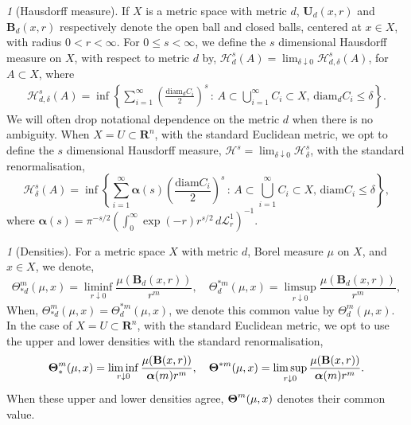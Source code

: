 \documentclass{article}
\theoremstyle{plain}
\theoremstyle{definition}
\theoremstyle{plain}
\theoremstyle{remark}
\newtheorem{propparagraph}[theorem]{}
\theoremstyle{remark}
\theoremstyle{plain}
\DeclareMathOperator*{\bfalpha}{\boldsymbol{\alpha}}
\DeclareMathOperator*{\Density}{\boldsymbol{\rm \Theta}}
\begin{document}
\begin{propparagraph}[Hausdorff measure]\label{para: hausdorff measure}
If $X$ is a metric space
with metric $d$, $\mathbf U_{d}(x,r)$ and $\mathbf B_{d}(x,r)$ respectively denote the open ball and closed balls, centered at $x\in X$, with radius $0<r<\infty$.
For $0 \leq s <  \infty$, we define the $s$ dimensional Hausdorff measure on $X$, with respect to metric $d$ by, $\mathscr{H}_{d}^{s} (A) = \lim_{\delta \downarrow 0} \mathscr{H}_{d, \delta}^{s} (A)$, for $A \subset X$, where
    \begin{eqnarray*}
         \mathscr{H}_{d, \delta}^{s} (A) = \inf \left\{ \sum_{i = 1}^{\infty} \left( \frac{\mathrm{diam}_{d} C_{i}}{2} \right)^{s} \, \colon \, A \subset \bigcup_{i = 1}^{\infty} C_{i} \subset X, \, \mathrm{diam}_{d} C_{i} \leq \delta \right\}.
    \end{eqnarray*}
We will often drop notational dependence on the metric $d$ when there is no ambiguity.
When $X = U \subset \mathbf{R}^{n}$, with the standard Euclidean metric, we opt to define the $s$ dimensional Hausdorff measure, $\mathscr{H}^{s} = \lim_{\delta \downarrow 0} \mathscr{H}^{s}_{\delta}$, with the standard renormalisation, 
\begin{equation*}
    \mathscr{H}_{\delta}^{s} (A) = \inf \left\{ \sum_{i = 1}^{\infty} \boldsymbol{\alpha} (s)\left( \frac{\mathrm{diam} C_{i}}{2} \right)^{s} \, \colon \, A \subset \bigcup_{i = 1}^{\infty} C_{i} \subset X, \, \mathrm{diam} C_{i} \leq \delta \right\},
\end{equation*}
where $\boldsymbol{\alpha} (s) = \pi^{- s / 2} \left( \int_{0}^{\infty} \exp (-r) r^{s / 2} \, d \mathscr{L}^{1}_{r} \right)^{-1}$.
\end{propparagraph}

\begin{propparagraph}[Densities]\label{para: densities}
    For a metric space $X$ with metric $d$, Borel measure $\mu$ on $X$, and $x \in X$, we denote,
    \begin{equation*}
        \Theta_{* d}^{m} (\mu ,x) = \liminf_{r \downarrow 0} \frac{\mu (\mathbf{B}_{d} (x, r))}{r^{m}}, \quad \Theta_{d}^{* m} (\mu ,x) = \limsup_{r \downarrow 0} \frac{\mu (\mathbf{B}_{d} (x, r))}{r^{m}},
    \end{equation*}
    When, $\Theta_{* d}^{m} (\mu ,x) = \Theta_{d}^{* m} (\mu ,x)$, we denote this common value by $\Theta_{d}^{m} (\mu, x)$.
    In the case of $X = U \subset \mathbf{R}^{n}$, with the standard Euclidean metric, we opt to use the upper and lower densities with the standard renormalisation,
    \[{\textstyle  \Density_{*}^{m} }(\mu ,x) = \liminf\limits_{r \downarrow 0} \frac{\mu (\mathbf{B} (x, r))}{\bfalpha(m)r^{m}}, \quad {\textstyle \Density^{* m}} (\mu ,x) = \limsup\limits_{r \downarrow 0} \frac{\mu (\mathbf{B} (x, r))}{\bfalpha(m)r^{m}}.\]
    When these upper and lower densities agree, $\Density^m(\mu,x)$ denotes their common value.
\end{propparagraph}
\end{document}

